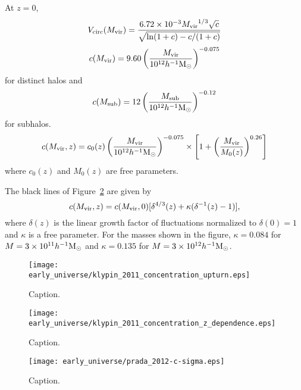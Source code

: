 At $z = 0$,
\begin{equation}
	{V_{\mathrm{circ}}}({M_{\mathrm{vir}}}) = \frac{6.72 \times 10^{-3} {M_{\mathrm{vir}}}^{1/3} \sqrt{c}}{\sqrt{\ln(1 + c) - c / (1 + c)}}
\end{equation}
\begin{equation}
	c({M_{\mathrm{vir}}}) = 9.60 \left( \frac{{M_{\mathrm{vir}}}}{10^{12} h^{-1} {\rm M_\odot}} \right)^{-0.075}
\end{equation}
for distinct halos and
\begin{equation}
	c(M_{\mathrm{sub}}) = 12 \left( \frac{M_{\mathrm{sub}}}{10^{12} h^{-1} {\rm M_\odot}} \right)^{-0.12}
\end{equation}
for subhalos.
\begin{equation}
	c({M_{\mathrm{vir}}},z) = c_{0}(z) \left( \frac{{M_{\mathrm{vir}}}}{10^{12} h^{-1} {\rm M_\odot}} \right)^{-0.075} \times \left[ 1 + \left( \frac{{M_{\mathrm{vir}}}}{M_{0}(z)} \right)^{0.26} \right]
\end{equation}
where $c_{0}(z)$ and $M_{0}(z)$ are free parameters.

The black lines of Figure~\ref{fig:concentration--klypin_concentration_z_dependence} are given by
\begin{equation}
	c({M_{\mathrm{vir}}}, z) = c({M_{\mathrm{vir}}}, 0) [\delta^{4/3}(z) + \kappa(\delta^{-1}(z) - 1)],
\end{equation}
where $\delta(z)$ is the linear growth factor of fluctuations normalized to $\delta(0) = 1$ and $\kappa$ is a free parameter.  For the masses shown in the figure, $\kappa = 0.084$ for $M = 3 \times 10^{11} h^{-1} {\rm M_\odot}$ and $\kappa = 0.135$ for $M = 3 \times 10^{12} h^{-1} {\rm M_\odot}$.

\begin{figure}[ht]
	\centering
	\texttt{[image: early\_universe/klypin\_2011\_concentration\_upturn.eps]}
	\caption[Caption]{\footnotesize Caption.}
	\label{fig:concentration--klypin_concentration_upturn}
\end{figure}

\begin{figure}[ht]
	\centering
	\texttt{[image: early\_universe/klypin\_2011\_concentration\_z\_dependence.eps]}
	\caption[Caption]{\footnotesize Caption.}
	\label{fig:concentration--klypin_concentration_z_dependence}
\end{figure}

\begin{figure}[ht]
	\centering
	\texttt{[image: early\_universe/prada\_2012-c-sigma.eps]}
	\caption[Caption]{\footnotesize Caption.}
	\label{fig:concentration--prada_c_sigma}
\end{figure}


